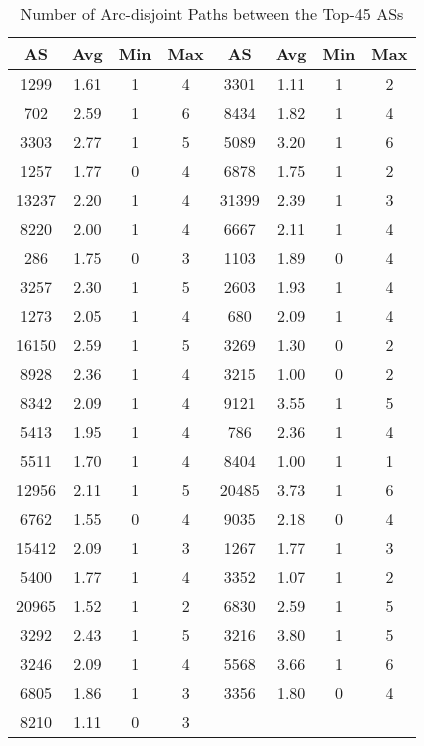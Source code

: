 \documentclass[10pt,final,journal]{IEEEtran}
\begin{document}
\begin{table}[!t]
  \renewcommand{\arraystretch}{1.2}
	\caption{Number of Arc-disjoint Paths between the Top-45 ASs}
	\label{tab:TheTop45}
	\centering
		\begin{tabular}{|c|c c c||c|c c c|}
			\hline	\textbf{AS} & \textbf{Avg} & \textbf{Min} & \textbf{Max} &
							\textbf{AS} & \textbf{Avg} & \textbf{Min} & \textbf{Max} \\
      \hline
      \hline	1299	&	1.61	&	1	&	4	&	3301	&	1.11	&	 1	&	2	\\
      \hline	702		&	2.59	&	1	&	6	&	8434	&	1.82	&	 1	&	4\\
      \hline	3303	&	2.77	&	1	&	5	&	5089	&	3.20	&	 1	&	6\\
      \hline	1257	&	1.77	&	0	&	4	&	6878	&	1.75	&	 1	&	2\\
      \hline	13237	&	2.20	&	1	&	4	&	31399	&	2.39	&	 1	&	3\\
      \hline	8220	&	2.00	&	1	&	4	&	6667	&	2.11	&	 1	&	4\\
      \hline	286		&	1.75	&	0	&	3	&	1103	&	1.89	&	 0	&	4\\
      \hline	3257	&	2.30	&	1	&	5	&	2603	&	1.93	&	 1	&	4\\
      \hline	1273	&	2.05	&	1	&	4	&	680		&	2.09	&	 1	&	4\\
      \hline	16150	&	2.59	&	1	&	5	&	3269	&	1.30	&	 0	&	2\\
      \hline	8928	&	2.36	&	1	&	4	&	3215	&	1.00	&	 0	&	2\\
      \hline	8342	&	2.09	&	1	&	4	&	9121	&	3.55	&	 1	&	5\\
      \hline	5413	&	1.95	&	1	&	4	&	786		&	2.36	&	 1	&	4\\
      \hline	5511	&	1.70	&	1	&	4	&	8404	&	1.00	&	 1	&	1\\
      \hline	12956	&	2.11	&	1	&	5	&	20485	&	3.73	&	 1	&	6\\
      \hline	6762	&	1.55	&	0	&	4	&	9035	&	2.18	&	 0	&	4\\
      \hline	15412	&	2.09	&	1	&	3	&	1267	&	1.77	&	 1	&	3\\
      \hline	5400	&	1.77	&	1	&	4	&	3352	&	1.07	&	 1	&	2\\
      \hline	20965	&	1.52	&	1	&	2	&	6830	&	2.59	&	 1	&	5\\
      \hline	3292	&	2.43	&	1	&	5	&	3216	&	3.80	&	 1	&	5\\
      \hline	3246	&	2.09	&	1	&	4	&	5568	&	3.66	&	 1	&	6\\
      \hline	6805	&	1.86	&	1	&	3	&	3356	&	1.80	&	 0	&	4\\
      \hline	8210	&	1.11	&	0	&	3	&	&	&	&	\\
			\hline
		\end{tabular}
\end{table}
\end{document}
